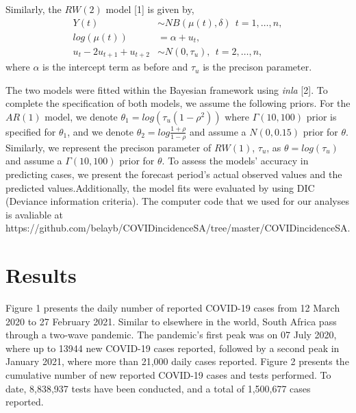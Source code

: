\documentclass[10pt,letterpaper]{article}
\begin{document}
Similarly, the \(RW(2)\) model {[}1{]} is given by, \[
\begin{aligned}
 Y(t) &\sim NB(\mu(t), \delta) \ \ t=1, \dots, n,\\
 log(\mu(t)) &= \alpha+u_t, \\
 u_t-2u_{t+1}+u_{t+2} &\sim N(0, \tau_u), \ \ t=2, \dots, n,
\end{aligned}
\] where \(\alpha\) is the intercept term as before and \(\tau_u\) is
the precison parameter.

The two models were fitted within the Bayesian framework using
\emph{inla} {[}2{]}. To complete the specification of both models, we
assume the following priors. For the \(AR(1)\) model, we denote
\(\theta_1=log(\tau_u(1-\rho^2))\) where \(\Gamma(10,100)\) prior is
specified for \(\theta_1\), and we denote
\(\theta_2=log\frac{1+\rho}{1-\rho}\) and assume a \(N(0, 0.15)\) prior
for \(\theta\). Similarly, we represent the precison parameter of
\(RW(1)\), \(\tau_u\), as \(\theta=log(\tau_u)\) and assume a
\(\Gamma (10,100)\) prior for \(\theta\). To assess the models' accuracy
in predicting cases, we present the forecast period's actual observed
values and the predicted values.Additionally, the model fits were
evaluated by using DIC (Deviance information criteria). The computer
code that we used for our analyses is avaliable at
https://github.com/belayb/COVIDincidenceSA/tree/master/COVIDincidenceSA.

\hypertarget{results}{%
\section{Results}\label{results}}

Figure 1 presents the daily number of reported COVID-19 cases from 12
March 2020 to 27 February 2021. Similar to elsewhere in the world, South
Africa pass through a two-wave pandemic. The pandemic's first peak was
on 07 July 2020, where up to 13944 new COVID-19 cases reported, followed
by a second peak in January 2021, where more than 21,000 daily cases
reported. Figure 2 presents the cumulative number of new reported
COVID-19 cases and tests performed. To date, 8,838,937 tests have been
conducted, and a total of 1,500,677 cases reported.
\end{document}
